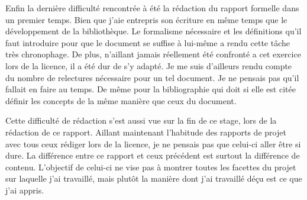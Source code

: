 Enfin la dernière difficulté rencontrée à été la rédaction du rapport formelle 
dans un premier temps. Bien que j'aie entrepris son écriture en même temps que 
le développement de la bibliothèque. Le formalisme nécessaire et les définitions 
qu'il faut introduire pour que le document se suffise à lui-même a rendu cette 
tâche très chronophage. De plus, n'aillant jamais réellement été confronté a 
cet exercice lors de la licence, il a été dur de s'y adapté. Je me suis 
d'ailleurs rendu compte du nombre de relectures nécessaire pour un tel document. 
Je ne pensais pas qu'il fallait en faire au temps. De même pour la bibliographie 
qui doit si elle est citée définir les concepts de la même manière que ceux 
du document.

Cette difficulté de rédaction s'est aussi vue sur la fin de ce stage, lors de la 
rédaction de ce rapport. Aillant maintenant l'habitude des rapports de projet 
avec tous ceux rédiger lors de la licence, je ne pensais pas que celui-ci aller 
être si dure. La différence entre ce rapport et ceux précédent est surtout la 
différence de contenu. L'objectif de celui-ci ne vise pas à montrer toutes les 
facettes du projet sur laquelle j'ai travaillé, mais plutôt la manière dont j'ai 
travaillé déçu est ce que j'ai appris. 

